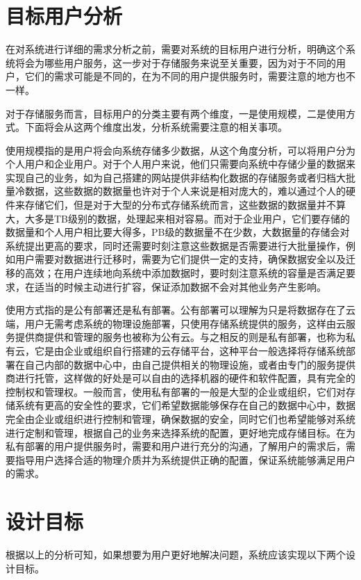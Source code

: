 \section{目标用户分析}
在对系统进行详细的需求分析之前，需要对系统的目标用户进行分析，明确这个系统将会为哪些用户服务，这一步对于存储服务来说至关重要，因为对于不同的用户，它们的需求可能是不同的，在为不同的用户提供服务时，需要注意的地方也不一样。

对于存储服务而言，目标用户的分类主要有两个维度，一是使用规模，二是使用方式。下面将会从这两个维度出发，分析系统需要注意的相关事项。

使用规模指的是用户将会向系统存储多少数据，从这个角度分析，可以将用户分为个人用户和企业用户。对于个人用户来说，他们只需要向系统中存储少量的数据来实现自己的业务，如为自己搭建的网站提供非结构化数据的存储服务或者归档大批量冷数据，这些数据的数据量也许对于个人来说是相对庞大的，难以通过个人的硬件来存储它们，但是对于大型的分布式存储系统而言，这些数据的数据量并不算大，大多是TB级别的数据，处理起来相对容易。而对于企业用户，它们要存储的数据量和个人用户相比要大得多，PB级的数据量不在少数，大数据量的存储会对系统提出更高的要求，同时还需要时刻注意这些数据是否需要进行大批量操作，例如用户需要对数据进行迁移时，需要为它们提供一定的支持，确保数据安全以及迁移的高效；在用户连续地向系统中添加数据时，要时刻注意系统的容量是否满足要求，在适当的时候主动进行扩容，保证添加数据不会对其他业务产生影响。

使用方式指的是公有部署还是私有部署。公有部署可以理解为只是将数据存在了云端，用户无需考虑系统的物理设施部署，只使用存储系统提供的服务，这样由云服务提供商提供和管理的服务也被称为公有云。与之相反的则是私有部署，也称为私有云，它是由企业或组织自行搭建的云存储平台，这种平台一般选择将存储系统部署在自己内部的数据中心中，由自己提供相关的物理设施，或者由专门的服务提供商进行托管，这样做的好处是可以自由的选择机器的硬件和软件配置，具有完全的控制权和管理权。一般而言，使用私有部署的一般是大型的企业或组织，它们对存储系统有更高的安全性的要求，它们希望数据能够保存在自己的数据中心中，数据完全由企业或组织进行控制和管理，确保数据的安全，同时它们也希望能够对系统进行定制和管理，根据自己的业务来选择系统的配置，更好地完成存储目标。在为私有部署的用户提供服务时，需要和用户进行充分的沟通，了解用户的需求后，需要指导用户选择合适的物理介质并为系统提供正确的配置，保证系统能够满足用户的需求。

\section{设计目标}
根据以上的分析可知，如果想要为用户更好地解决问题，系统应该实现以下两个设计目标。

